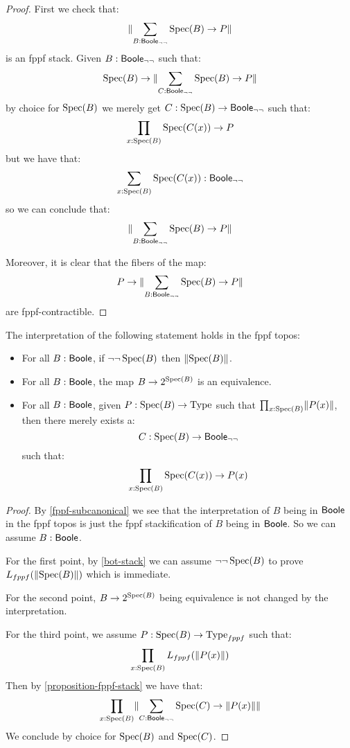 \begin{proof}
First we check that: 
\[\lVert \sum_{B:\mathsf{Boole}_{\neg\neg}}\operatorname{Spec}(B)\to P \rVert\]
is an fppf stack. Given $B:\mathsf{Boole}_{\neg\neg}$ such that:
\[\operatorname{Spec}(B)\to \lVert \sum_{C:\mathsf{Boole}_{\neg\neg}}\operatorname{Spec}(B)\to P \rVert\]
by choice for $\operatorname{Spec}(B)$ we merely get $C:\operatorname{Spec}(B)\to \mathsf{Boole}_{\neg\neg}$ such that:
\[\prod_{x:\operatorname{Spec}(B)}\operatorname{Spec}(C(x))\to P\]
but we have that:
\[\sum_{x:\operatorname{Spec}(B)}\operatorname{Spec}(C(x)):\mathsf{Boole}_{\neg\neg}\]
so we can conclude that:
\[\lVert \sum_{B:\mathsf{Boole}_{\neg\neg}}\operatorname{Spec}(B)\to P \rVert\]

Moreover, it is clear that the fibers of the map:
\[P\to \lVert \sum_{B:\mathsf{Boole}_{\neg\neg}}\operatorname{Spec}(B)\to P \rVert\] 
are fppf-contractible.
\end{proof}

\begin{theorem}
The interpretation of the following statement holds in the fppf topos:
\begin{itemize}
\item For all $B:\mathsf{Boole}$, if $\neg\neg\operatorname{Spec}(B)$ then $\lVert \operatorname{Spec}(B) \rVert$.
\item For all $B:\mathsf{Boole}$, the map $B\to {2}^{\operatorname{Spec}(B)}$ is an equivalence.
\item For all $B:\mathsf{Boole}$, given $P:\operatorname{Spec}(B)\to \mathrm{Type}$ such that $\prod_{x:\operatorname{Spec}(B)}\lVert P(x) \rVert$, then there merely exists a:
\[C:\operatorname{Spec}(B)\to \mathsf{Boole}_{\neg\neg}\] 
such that:
\[\prod_{x:\operatorname{Spec}(B)} \operatorname{Spec}(C(x))\to P(x)\]
\end{itemize}
\end{theorem}

\begin{proof}
By \cref{fppf-subcanonical} we see that the interpretation of $B$ being in $\mathsf{Boole}$ in the fppf topos is just the fppf stackification of $B$ being in $\mathsf{Boole}$. So we can assume $B:\mathsf{Boole}$.

For the first point, by \cref{bot-stack} we can assume $\neg\neg\operatorname{Spec}(B)$ to prove $L_{fppf}(\lVert \operatorname{Spec}(B) \rVert)$ which is immediate.

For the second point, $B\to {2}^{\operatorname{Spec}(B)}$ being equivalence is not changed by the interpretation.

For the third point, we assume $P:\operatorname{Spec}(B)\to \mathrm{Type}_{fppf}$ such that:
\[\prod_{x:\operatorname{Spec}(B)}L_{fppf}(\lVert P(x) \rVert)\] 
Then by \cref{proposition-fppf-stack} we have that:
\[\prod_{x:\operatorname{Spec}(B)}\lVert \sum_{C:\mathsf{Boole}_{\neg\neg}} \operatorname{Spec}(C)\to \lVert P(x) \rVert \rVert\]
We conclude by choice for $\operatorname{Spec}(B)$ and $\operatorname{Spec}(C)$.
\end{proof}

